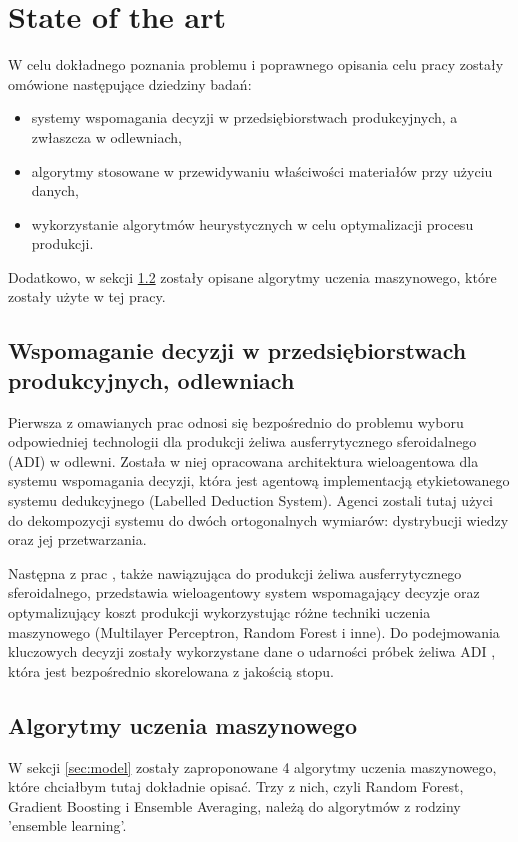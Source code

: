 \chapter{State of the art}
W celu dokładnego poznania problemu i poprawnego opisania celu pracy zostały o\-mó\-wio\-ne następujące dziedziny badań:
\begin{itemize}
    \item systemy wspomagania decyzji w przedsiębiorstwach produkcyjnych, a zwłaszcza w odlewniach,
    \item algorytmy stosowane w przewidywaniu właściwości materiałów przy użyciu danych,
    \item wykorzystanie algorytmów heurystycznych w celu optymalizacji procesu produkcji.
\end{itemize}

Dodatkowo, w sekcji \ref{sec:ml_algs} zostały opisane algorytmy uczenia maszynowego, które zostały użyte w tej pracy.

\section{Wspomaganie decyzji w przedsiębiorstwach produkcyjnych, od\-lew\-niach}
Pierwsza z omawianych prac \cite{LEGIEN2017897} odnosi się bezpośrednio do problemu wyboru odpowiedniej technologii dla produkcji żeliwa ausferrytycznego sferoidalnego (ADI) w odlewni. Została w niej opracowana architektura wieloagentowa dla systemu wspomagania decyzji, która jest agentową implementacją etykietowanego systemu dedukcyjnego (Labelled Deduction System). Agenci zostali tutaj użyci do dekompozycji systemu do dwóch ortogonalnych wymiarów: dystrybucji wiedzy oraz jej przetwarzania.

Następna z prac \cite{kozlak_2019_agenty}, także nawiązująca do produkcji żeliwa ausferrytycznego sfe\-ro\-idal\-nego, przedstawia wieloagentowy system wspomagający decyzje oraz optymalizujący koszt produkcji wykorzystując różne techniki uczenia maszynowego (Multilayer Perceptron, Random Forest i inne). Do podejmowania kluczowych decyzji zostały wykorzystane dane o udarności próbek żeliwa ADI \cite{Wilk-Kolodziejczyk2018}, która jest bezpośrednio skorelowana z jakością stopu. 

\section{Algorytmy uczenia maszynowego}\label{sec:ml_algs}
W sekcji \ref{sec:model} zostały zaproponowane 4 algorytmy uczenia maszynowego, które chciałbym tutaj dokładnie opisać. Trzy z nich, czyli Random Forest, Gradient Boosting i Ensemble Averaging, należą do algorytmów z rodziny 'ensemble learning'. 

